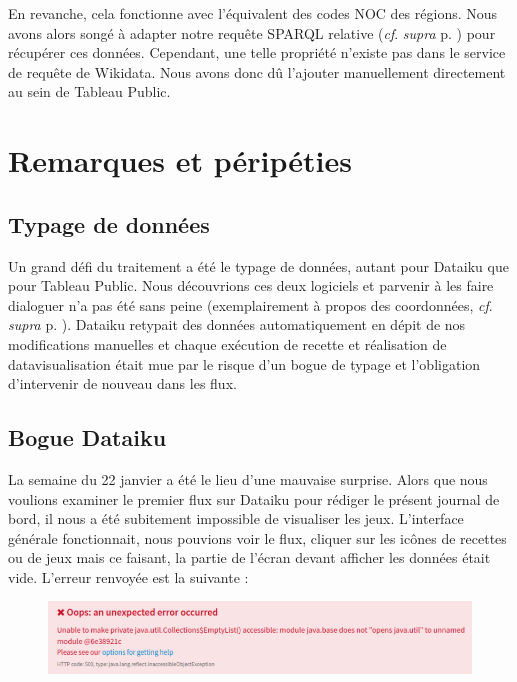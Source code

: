 \documentclass[hidelinks, 12pt]{report}
\begin{document}
En revanche, cela fonctionne avec l'équivalent des codes NOC des régions. Nous avons alors songé à adapter notre requête SPARQL relative (\textit{cf}. \textit{supra} p. \pageref{queryeng}) pour récupérer ces données. Cependant, une telle propriété n'existe pas dans le service de requête de Wikidata. Nous avons donc dû l'ajouter manuellement directement au sein de Tableau Public.





%





\chapter{Remarques et péripéties}

\section{Typage de données}

Un grand défi du traitement a été le typage de données, autant pour Dataiku que pour Tableau Public. Nous découvrions ces deux logiciels et parvenir à les faire dialoguer n'a pas été sans peine (exemplairement à propos des coordonnées, \textit{cf}. \textit{supra} p. \pageref{casse}). Dataiku retypait des données automatiquement en dépit de nos modifications manuelles et chaque exécution de recette et réalisation de datavisualisation était mue par le risque d'un bogue de typage et l'obligation d'intervenir de nouveau dans les flux.

\section{Bogue Dataiku}

La semaine du 22 janvier a été le lieu d'une mauvaise surprise. Alors que nous voulions examiner le premier flux sur Dataiku pour rédiger le présent journal de bord, il nous a été subitement impossible de visualiser les jeux. L'interface générale fonctionnait, nous pouvions voir le flux, cliquer sur les icônes de recettes ou de jeux mais ce faisant, la partie de l'écran devant afficher les données était vide. L'erreur renvoyée est la suivante :

\begin{center}
	\begin{figure}[H]
		\includegraphics[scale=0.49]{images/bogue.png}
	\end{figure}
\end{center}
\end{document}
